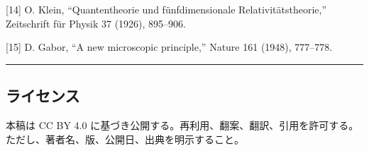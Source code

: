 \documentclass[
]{ltjsarticle}
\begin{document}
{[}14{]} O. Klein, ``Quantentheorie und fünfdimensionale
Relativitätstheorie,'' Zeitschrift für Physik 37 (1926), 895--906.

{[}15{]} D. Gabor, ``A new microscopic principle,'' Nature 161 (1948),
777--778.

\begin{center}\rule{0.5\linewidth}{0.5pt}\end{center}

\subsection{ライセンス}\label{ux30e9ux30a4ux30bbux30f3ux30b9}

本稿は CC BY 4.0
に基づき公開する。再利用、翻案、翻訳、引用を許可する。ただし、著者名、版、公開日、出典を明示すること。
\end{document}
